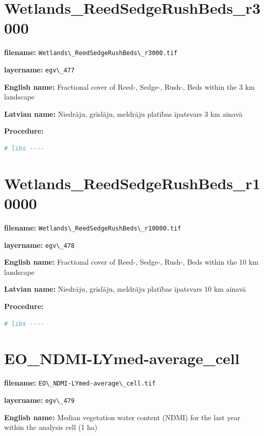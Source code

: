 \documentclass[
]{book}
\newcommand{\passthrough}[1]{#1}
\begin{document}
\section{Wetlands\_ReedSedgeRushBeds\_r3000}\label{ch06.477}

\textbf{filename:} \passthrough{\lstinline!Wetlands\_ReedSedgeRushBeds\_r3000.tif!}

\textbf{layername:} \passthrough{\lstinline!egv\_477!}

\textbf{English name:} Fractional cover of Reed-, Sedge-, Rush-, Beds within the 3 km landscape

\textbf{Latvian name:} Niedrāju, grīslāju, meldrāju platības īpatsvars 3 km ainavā

\textbf{Procedure:}

\begin{lstlisting}[language=R]
# libs ----
\end{lstlisting}

\section{Wetlands\_ReedSedgeRushBeds\_r10000}\label{ch06.478}

\textbf{filename:} \passthrough{\lstinline!Wetlands\_ReedSedgeRushBeds\_r10000.tif!}

\textbf{layername:} \passthrough{\lstinline!egv\_478!}

\textbf{English name:} Fractional cover of Reed-, Sedge-, Rush-, Beds within the 10 km landscape

\textbf{Latvian name:} Niedrāju, grīslāju, meldrāju platības īpatsvars 10 km ainavā

\textbf{Procedure:}

\begin{lstlisting}[language=R]
# libs ----
\end{lstlisting}

\section{EO\_NDMI-LYmed-average\_cell}\label{ch06.479}

\textbf{filename:} \passthrough{\lstinline!EO\_NDMI-LYmed-average\_cell.tif!}

\textbf{layername:} \passthrough{\lstinline!egv\_479!}

\textbf{English name:} Median vegetation water content (NDMI) for the last year within the analysis cell (1 ha)
\end{document}
